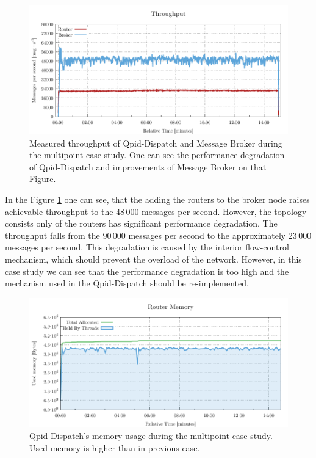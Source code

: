 \begin{figure}[H]
	\centering
	\includegraphics[width=1\linewidth]{obrazky-figures/charts/multipoint-throughput.pdf}
	\caption{Measured throughput of Qpid-Dispatch and Message Broker during the multipoint case study. One can see the performance degradation of Qpid-Dispatch and improvements of Message Broker on that Figure.}
	\label{fig:rate-multipoint-router}
\end{figure}

In the Figure \ref{fig:rate-multipoint-router} one can see, that the adding the routers to the broker node raises achievable throughput to the 48\,000 messages per second. However, the topology consists only of the routers has significant performance degradation. The throughput falls from the 90\,000 messages per second to the approximately 23\,000 messages per second. This degradation is caused by the interior flow-control mechanism, which should prevent the overload of the network. However, in this case study we can see that the performance degradation is too high and the mechanism used in the Qpid-Dispatch should be re-implemented.


\begin{figure}[H]
	\centering
	\includegraphics[width=1\linewidth]{obrazky-figures/charts/multipoint-router-only-throughput-memory.pdf}
	\caption{Qpid-Dispatch's memory usage during the multipoint case study. Used memory is higher than in previous case.}
	\label{fig:router-multipoint-memory}
\end{figure}

